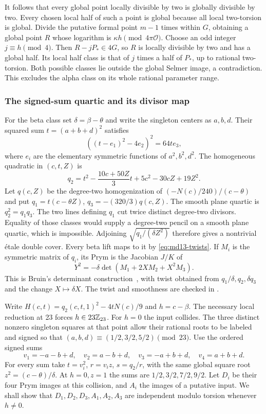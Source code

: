 It follows that every global point locally divisible by two is
globally divisible by two. Every chosen local half of such a point
is global because all local two-torsion is global. Divide the
putative formal point $m-1$ times within $G$, obtaining a global
point $R$ whose logarithm is $\kappa h\pmod{4\pi\mathcal O}$.
Choose an odd integer $j\equiv h\pmod4$. Then $R-jP_*\in4G$,
so $R$ is locally divisible by two and has a global half. Its local
half class is that of $j$ times a half of $P_*$, up to rational
two-torsion. Both possible classes lie outside the global Selmer
image, a contradiction. This excludes the alpha class on its whole
rational parameter range.

\subsubsection{The signed-sum quartic and its divisor map}

For the beta class set $\delta=\beta-\theta$ and write the singleton
centers as $a,b,d$. Their squared sum $t=(a+b+d)^2$ satisfies
\[
 ((t-e_1)^2-4e_2)^2=64te_3,
\]
where $e_i$ are the elementary symmetric functions of $a^2,b^2,d^2$.
The homogeneous quadratic in $(c,t,Z)$ is
\[
 q_2=t^2-\frac{10c+50Z}{3}t+5c^2-30cZ+19Z^2.
\]
Let $q(c,Z)$ be the degree-two homogenization of
$(-N(c)/240)/(c-\theta)$ and put
$q_1=t(c-\theta Z)$, $q_3=-(320/3)q(c,Z)$.
The smooth plane quartic is $q_2^2=q_1q_3$. The two lines defining
$q_1$ cut twice distinct degree-two divisors. Equality of those
classes would supply a degree-two pencil on a smooth plane quartic,
which is impossible. Adjoining $\sqrt{q_1/(\delta Z^2)}$ therefore
gives a nontrivial étale double cover. Every beta lift maps to it by
\eqref{eq:md13-twists}. If $M_i$ is the symmetric matrix of $q_i$,
its Prym is the Jacobian $J/K$ of
\begin{equation}\label{eq:md13-prym}
 Y^2=-\delta\det(M_1+2XM_2+X^2M_3).
\end{equation}
This is Bruin's determinant construction~\cite[Theorem~5.1]{BruinPrym}, with twist obtained from
$q_1/\delta,q_2,\delta q_3$ and the change $X\mapsto\delta X$.
The twist and smoothness are checked in
.

Write $H(c,t)=q_2(c,t,1)^2-4tN(c)/9$ and $h=c-\beta$.
The necessary local reduction at 23 forces $h\in23\mathbb Z_{23}$.
For $h=0$ the input collides. The three distinct nonzero singleton
squares at that point allow their rational roots to be labeled and
signed so that $(a,b,d)\equiv(1/2,3/2,5/2)\pmod{23}$.
Use the ordered signed sums
\[
 v_1=-a-b+d,\quad v_2=a-b+d,\quad
 v_3=-a+b+d,\quad v_4=a+b+d.
\]
For every sum take $t=v_i^2$, $r=v_i z$, $s=q_2/r$, with the
same global square root $z^2=(c-\theta)/\delta$. At $h=0,z=1$
the sums are $1/2,3/2,7/2,9/2$. Let $D_i$ be their four Prym
images at this collision, and $A_i$ the images of a putative input.
We shall show that $D_1,D_2,D_3,A_1,A_2,A_3$ are independent
modulo torsion whenever $h\ne0$.

